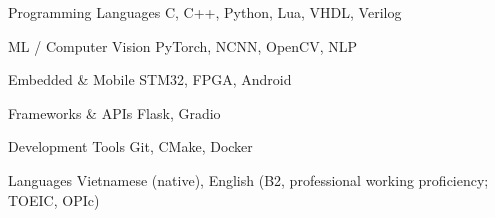 

\begin{cvskills}




  \cvskill
  {Programming Languages} %
  {C, C++, Python, Lua, VHDL, Verilog} %

  \cvskill
  {ML / Computer Vision} %
  {PyTorch, NCNN, OpenCV, NLP} %

  \cvskill
  {Embedded \& Mobile} %
  {STM32, FPGA, Android} %

  \cvskill
  {Frameworks \& APIs} %
  {Flask, Gradio} %

  \cvskill
  {Development Tools} %
  {Git, CMake, Docker} %

  \cvskill
  {Languages} %
  {Vietnamese (native), English (B2, professional working proficiency; TOEIC, OPIc)} %

\end{cvskills}
